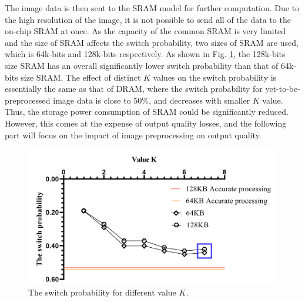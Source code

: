 \documentclass[lettersize,journal]{IEEEtran}
\begin{document}
The image data is then sent to the SRAM model for further computation. Due to the high resolution of the image, it is not possible to send all of the data to the on-chip SRAM at once. As the capacity of the common SRAM is very limited and the size of SRAM affects the switch probability, two sizes of SRAM are used, which is 64k-bits and 128k-bits respectively. As shown in Fig. \ref{fig8}, the 128k-bits size SRAM has an overall significantly lower switch probability than that of 64k-bits size SRAM. The effect of distinct $K$ values on the switch probability is essentially the same as that of DRAM, where the switch probability for yet-to-be-preprocessed image data is close to 50\%, and decreases with smaller $K$ value. Thus, the storage power consumption of SRAM could be significantly reduced. However, this comes at the expense of output quality losses, and the following part will focus on the impact of image preprocessing on output quality.
\begin{figure}[htb]
\centering
\includegraphics[width=\linewidth]{Fig/The switch probability for different value k.png}
\caption{The switch probability for different value $K$.}
\label{fig8}
\end{figure}
\end{document}
